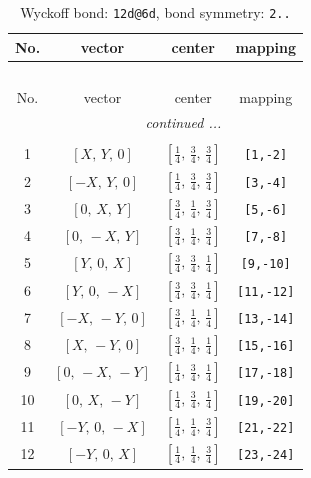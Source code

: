 \documentclass[fleqn,8pt]{jsarticle}
\begin{document}
\begin{longtable}{cccc}
\caption{Wyckoff bond: {\tt 12d@6d}, bond symmetry: {\tt 2..}}
 \\
 \hline \hline
No. & vector & center & mapping \\ \hline \endfirsthead

\multicolumn{3}{l}{\tablename\ \thetable{}} \\
 \hline \hline
No. & vector & center & mapping \\ \hline \endhead

 \hline \hline
\multicolumn{3}{r}{\footnotesize\it continued ...} \\ \endfoot

 \hline \hline
\multicolumn{3}{r}{} \\ \endlastfoot

1 & $\left[ X,\, Y,\, 0 \right]$ & $\left[ \frac{1}{4},\, \frac{3}{4},\, \frac{3}{4} \right]$ & {\tt [1,-2]} \\ \hline
2 & $\left[ - X,\, Y,\, 0 \right]$ & $\left[ \frac{1}{4},\, \frac{3}{4},\, \frac{3}{4} \right]$ & {\tt [3,-4]} \\ \hline
3 & $\left[ 0,\, X,\, Y \right]$ & $\left[ \frac{3}{4},\, \frac{1}{4},\, \frac{3}{4} \right]$ & {\tt [5,-6]} \\ \hline
4 & $\left[ 0,\, - X,\, Y \right]$ & $\left[ \frac{3}{4},\, \frac{1}{4},\, \frac{3}{4} \right]$ & {\tt [7,-8]} \\ \hline
5 & $\left[ Y,\, 0,\, X \right]$ & $\left[ \frac{3}{4},\, \frac{3}{4},\, \frac{1}{4} \right]$ & {\tt [9,-10]} \\ \hline
6 & $\left[ Y,\, 0,\, - X \right]$ & $\left[ \frac{3}{4},\, \frac{3}{4},\, \frac{1}{4} \right]$ & {\tt [11,-12]} \\ \hline
7 & $\left[ - X,\, - Y,\, 0 \right]$ & $\left[ \frac{3}{4},\, \frac{1}{4},\, \frac{1}{4} \right]$ & {\tt [13,-14]} \\ \hline
8 & $\left[ X,\, - Y,\, 0 \right]$ & $\left[ \frac{3}{4},\, \frac{1}{4},\, \frac{1}{4} \right]$ & {\tt [15,-16]} \\ \hline
9 & $\left[ 0,\, - X,\, - Y \right]$ & $\left[ \frac{1}{4},\, \frac{3}{4},\, \frac{1}{4} \right]$ & {\tt [17,-18]} \\ \hline
10 & $\left[ 0,\, X,\, - Y \right]$ & $\left[ \frac{1}{4},\, \frac{3}{4},\, \frac{1}{4} \right]$ & {\tt [19,-20]} \\ \hline
11 & $\left[ - Y,\, 0,\, - X \right]$ & $\left[ \frac{1}{4},\, \frac{1}{4},\, \frac{3}{4} \right]$ & {\tt [21,-22]} \\ \hline
12 & $\left[ - Y,\, 0,\, X \right]$ & $\left[ \frac{1}{4},\, \frac{1}{4},\, \frac{3}{4} \right]$ & {\tt [23,-24]} \\
\end{longtable}
\end{document}
